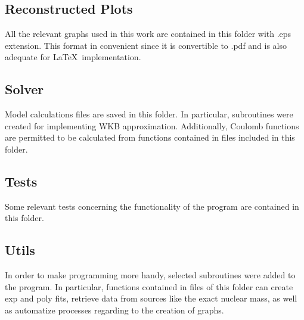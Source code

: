 \documentclass[openany]{book}
\begin{document}
\subsection{Reconstructed Plots} \label{sub:codesReconstructedPlots}

All the relevant graphs used in this work are contained in this folder with .eps extension. This format in convenient since it is convertible to .pdf and is also adequate for \LaTeX  \ implementation.


\subsection{Solver} \label{sub:codesSolver}

Model calculations files are saved in this folder. In particular, subroutines were created for implementing WKB approximation. Additionally, Coulomb functions are permitted to be calculated from functions contained in files included in this folder.

\subsection{Tests} \label{sub:codesTests}

Some relevant tests concerning the functionality of the program are contained in this folder.

\subsection{Utils} \label{sub:codesUtils}

In order to make programming more handy, selected subroutines were added to the program. In particular, functions contained in files of this folder can create exp and poly fits, retrieve data from sources like the exact nuclear mass, as well as automatize processes regarding to the creation of graphs.

\newpage


\end{document}
